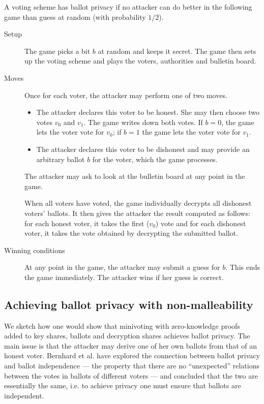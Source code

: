 \documentclass[envcountsame]{llncs}
\begin{document}
\begin{definition}
A voting scheme has ballot privacy if no attacker can do better in the following
game than guess at random (with probability $1/2$).

\begin{description}
\item[Setup] The game picks a bit $b$ at random and keeps it secret. The game
then sets up the voting scheme and plays the voters, authorities and bulletin
board.

\item[Moves] Once for each voter, the attacker may perform one of two moves.
\begin{itemize}
\item The attacker declares this voter to be honest. She may then choose two votes $v_0$ and
$v_1$. The game writes down both votes. If $b = 0$, the game lets the voter vote
for $v_0$; if $b = 1$ the game lets the voter vote for $v_1$.

\item The attacker declares this voter to be dishonest and may provide an
arbitrary ballot $b$ for the voter, which the game processes.
\end{itemize}

The attacker may ask to look at the bulletin board at any point in the game.

When all voters have voted, the game individually decrypts all dishonest voters' ballots. It then gives the attacker the result computed as follows:
for each honest voter, it takes the first ($v_0$) vote and for each dishonest
voter, it takes the vote obtained by decrypting the submitted ballot.

\item[Winning conditions]
At any point in the game, the attacker may submit a guess for $b$. This ends the
game immediately. The attacker wins if her guess is correct.
\end{description}
\end{definition}

\subsection{Achieving ballot privacy with non-malleability}

We sketch how one would show that minivoting with zero-knowledge proofs added to
key shares, ballots and decryption shares achieves ballot privacy. The main
issue is that the attacker may derive one of her own ballots from that of an
honest voter. Bernhard et al. \cite{BPW12a,BS13} have explored the connection
between ballot privacy and ballot independence --- the property that there are
no ``unexpected'' relations between the votes in ballots of different voters ---
and concluded that the two are essentially the same, i.e. to achieve privacy
one must ensure that ballots are independent.
\end{document}
